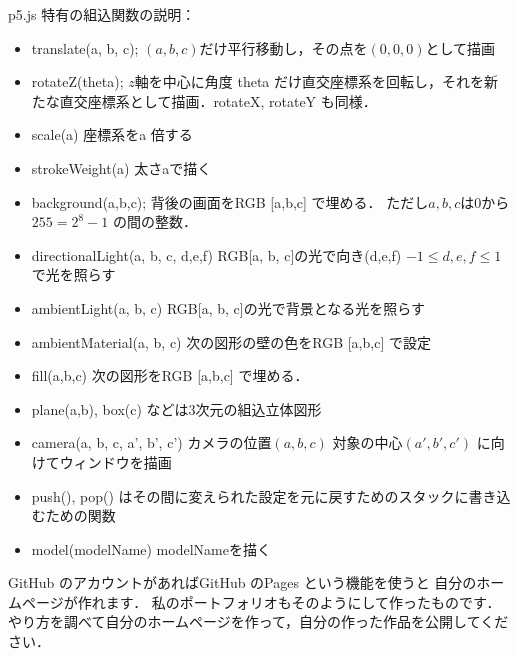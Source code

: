 p5.js 特有の組込関数の説明：
\begin{itemize}
   \item
      translate(a, b, c); $(a, b,c)$だけ平行移動し，その点を$(0,0,0)$として描画
   
   \item
      rotateZ(theta); $z$軸を中心に角度 theta だけ直交座標系を回転し，それを新たな直交座標系として描画．rotateX, rotateY も同様．
   \item
      scale(a) 座標系をa 倍する
   
   \item  
      strokeWeight(a) 太さaで描く
     
   \item
      background(a,b,c);  背後の画面をRGB [a,b,c] で埋める．
      ただし$a, b, c$は$0$から$255=2^8-1$ の間の整数．
   
   \item directionalLight(a, b, c, d,e,f) RGB[a, b, c]の光で向き(d,e,f) $-1\le d,e,f\le 1$ で光を照らす
   
   \item
       ambientLight(a, b, c) RGB[a, b, c]の光で背景となる光を照らす
       
    \item 
       ambientMaterial(a, b, c) 次の図形の壁の色をRGB [a,b,c] で設定
   
   \item 
      fill(a,b,c) 次の図形をRGB [a,b,c] で埋める．
   
   \item 
      plane(a,b), box(c) などは3次元の組込立体図形
   
   \item
      camera(a, b, c, a', b', c') カメラの位置$(a, b, c)$ 対象の中心$(a', b', c')$ に向けてウィンドウを描画
   
   \item
      push(), pop() はその間に変えられた設定を元に戻すためのスタックに書き込むための関数
   
   \item
      model(modelName) modelNameを描く

\end{itemize}



\begin{exQ}
GitHub のアカウントがあればGitHub のPages という機能を使うと
自分のホームページが作れます．
私のポートフォリオもそのようにして作ったものです．
やり方を調べて自分のホームページを作って，自分の作った作品を公開してください．
\end{exQ}


